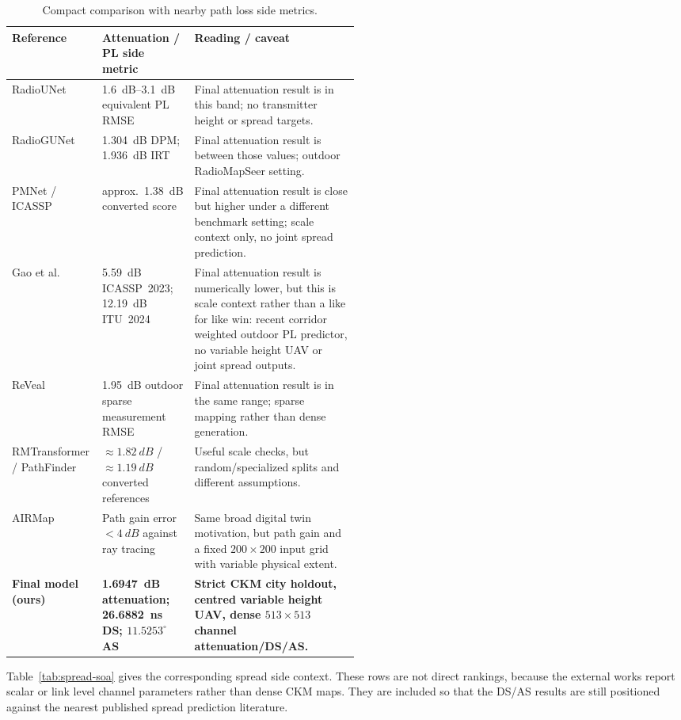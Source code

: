 \documentclass[journal]{IEEEtran}
\begin{document}
\begin{table}[t]
\centering
\caption{Compact comparison with nearby path loss side metrics.}
\label{tab:soa}
\scriptsize
\setlength{\tabcolsep}{3pt}
\begin{tabularx}{\linewidth}{p{0.26\linewidth}p{0.25\linewidth}X}
\toprule
Reference & Attenuation / PL side metric & Reading / caveat \\
\midrule
RadioUNet \cite{radiounet2020} &
\SI{1.6}{dB}--\SI{3.1}{dB} equivalent PL RMSE &
Final attenuation result is in this band; no transmitter height or spread targets. \\
RadioGUNet \cite{radiogunet2025} &
\SI{1.304}{dB} DPM; \SI{1.936}{dB} IRT &
Final attenuation result is between those values; outdoor RadioMapSeer setting. \\
PMNet / ICASSP \cite{pmnet_icassp2023,icassp2023challenge} &
approx.\ \SI{1.38}{dB} converted score &
Final attenuation result is close but higher under a different benchmark setting; scale context only, no joint spread prediction. \\
Gao et al.\ \cite{gao2026} &
\SI{5.59}{dB} ICASSP~2023; \SI{12.19}{dB} ITU~2024 &
Final attenuation result is numerically lower, but this is scale context rather than a
like for like win: recent corridor weighted outdoor PL predictor, no
variable height UAV or joint spread outputs. \\
ReVeal \cite{reveal2025} &
\SI{1.95}{dB} outdoor sparse measurement RMSE &
Final attenuation result is in the same range; sparse mapping rather than dense generation. \\
RMTransformer / PathFinder \cite{rmtransformer2025,pathfinder2025} &
\(\approx\SI{1.82}{dB}\) / \(\approx\SI{1.19}{dB}\) converted references &
Useful scale checks, but random/specialized splits and different assumptions. \\
AIRMap \cite{airmap2025} &
Path gain error \(<\SI{4}{dB}\) against ray tracing &
Same broad digital twin motivation, but path gain and a fixed \(200\times200\) input grid with variable physical extent. \\
\textbf{Final model (ours)} &
\textbf{\SI{1.6947}{dB} attenuation; \SI{26.6882}{ns} DS; \(11.5253^\circ\) AS} &
\textbf{Strict CKM city holdout, centred variable height UAV, dense \(513\times513\) channel attenuation/DS/AS.} \\
\bottomrule
\end{tabularx}
\end{table}

Table~\ref{tab:spread-soa} gives the corresponding spread side context. These
rows are not direct rankings, because the external works report scalar or
link level channel parameters rather than dense CKM maps. They are included so
that the DS/AS results are still positioned against the nearest published
spread prediction literature.
\end{document}
